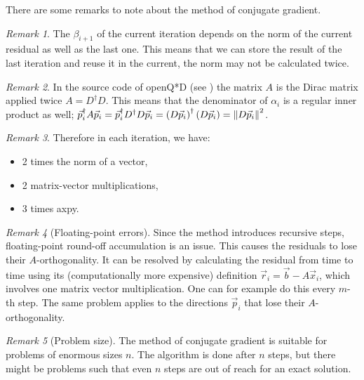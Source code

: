 \documentclass{article}
\theoremstyle{plain} %
\theoremstyle{convention} %
\theoremstyle{remark} %
\newtheorem*{remark}{Remark} %
\numberwithin{equation}{section}
\begin{document}
There are some remarks to note about the method of conjugate gradient.

\begin{remark}
    The $\beta_{i+1}$ of the current iteration depends on the norm of the current residual as well as the last one. This means that we can store the result of the last iteration and reuse it in the current, the norm may not be calculated twice.
\end{remark}

\begin{remark}
    In the source code of openQ*D (see \cite{openqxd}) the matrix $A$ is the Dirac matrix applied twice $A = D^{\dagger} D$. This means that the denominator of $\alpha_i$ is a regular inner product as well; $\vec{p}_i^{\dagger} A \vec{p}_i = \vec{p}_i^{\dagger} D^{\dagger} D \vec{p}_i = \left( D \vec{p}_i \right)^{\dagger} \left( D \vec{p}_i \right) = \norm{ D \vec{p}_i }^2$.
\end{remark}

\begin{remark}
    Therefore in each iteration, we have:
    \begin{itemize}
        \item 2 times the norm of a vector,
        \item 2 matrix-vector multiplications,
        \item 3 times axpy.\footnotemark
    \end{itemize}
\end{remark}


\begin{remark}[Floating-point errors]
    Since the method introduces recursive steps, floating-point round-off accumulation is an issue. This causes the residuals to lose their $A$-orthogonality. It can be resolved by calculating the residual from time to time using its (computationally more expensive) definition $\vec{r}_i = \vec{b} - A \vec{x}_i$, which involves one matrix vector multiplication. One can for example do this every $m$-th step. The same problem applies to the directions $\vec{p}_i$ that lose their $A$-orthogonality.
\end{remark}

\begin{remark}[Problem size]
    The method of conjugate gradient is suitable for problems of enormous sizes $n$. The algorithm is done after $n$ steps, but there might be problems such that even $n$ steps are out of reach for an exact solution.
\end{remark}
\end{document}
